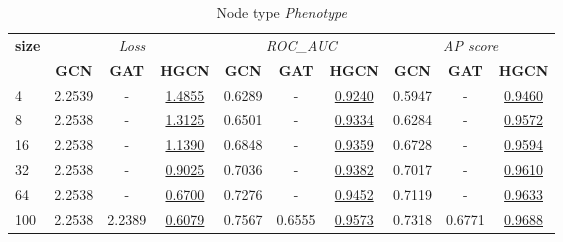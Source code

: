 \begin{table}
    \begin{subtable}[t]{\textwidth}
        \centering
        \begin{tabular}{l|ccc|ccc|ccc}   
        \toprule
            \multirow{2}{*}{\textbf{size}} & \multicolumn{3}{c|}{\textit{Loss}} & \multicolumn{3}{c|}{\textit{ROC\_AUC}} & \multicolumn{3}{c}{\textit{AP score}} \\
                & \textbf{GCN} & \textbf{GAT} & \textbf{HGCN} & \textbf{GCN} & \textbf{GAT} & \textbf{HGCN} & \textbf{GCN} & \textbf{GAT} & \textbf{HGCN} \\
            \midrule
            4 & 2.2539 & - & \underline{1.4855} & 0.6289 & - & \underline{0.9240} & 0.5947 & - & \underline{0.9460} \\
            8 & 2.2538 & - & \underline{1.3125} & 0.6501 & - & \underline{0.9334} & 0.6284 & - & \underline{0.9572} \\
            16 & 2.2538 & - & \underline{1.1390} & 0.6848 & - & \underline{0.9359} & 0.6728 & - & \underline{0.9594} \\
            32 & 2.2538 & - & \underline{0.9025} & 0.7036 & - & \underline{0.9382} & 0.7017 & - & \underline{0.9610} \\
            64 & 2.2538 & - & \underline{0.6700} & 0.7276 & - & \underline{0.9452} & 0.7119 & - & \underline{0.9633} \\
            100 & 2.2538 & 2.2389 & \underline{0.6079} & 0.7567 & 0.6555 & \underline{0.9573} & 0.7318 & 0.6771 & \underline{0.9688} \\
            \bottomrule
        \end{tabular}
        \caption{Node type \textit{Phenotype}}
    \end{subtable}
\end{table}
